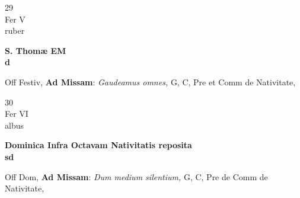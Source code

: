 \documentclass[10pt, openany]{book}
\begin{document}
        \begin{center}
            \begin{minipage}{3.5in}
                \vspace{2em}
                \begin{minipage}{0.5in}
                    {\Huge 29} \\
                    {\normalsize Fer V} \\
                    {\normalsize ruber}
                \end{minipage}
                \begin{minipage}{3.0in}
                    \textbf{ \large S. Thomæ EM \\
                    \textnormal{\normalsize d}} \\ 
                \end{minipage}
                \begin{justify}Off Festiv, \textbf{Ad Missam}: \textit{Gaudeamus omnes,} G, C, Pre et Comm de Nativitate,   
                \end{justify}
            \end{minipage}
        \end{center}
    
        \begin{center}
            \begin{minipage}{3.5in}
                \vspace{2em}
                \begin{minipage}{0.5in}
                    {\Huge 30} \\
                    {\normalsize Fer VI} \\
                    {\normalsize albus}
                \end{minipage}
                \begin{minipage}{3.0in}
                    \textbf{ \large Dominica Infra Octavam Nativitatis reposita \\
                    \textnormal{\normalsize sd}} \\ 
                \end{minipage}
                \begin{justify}Off Dom, \textbf{Ad Missam}: \textit{Dum medium silentium,} G, C, Pre de Comm de Nativitate,   
                \end{justify}
            \end{minipage}
        \end{center}
    
\end{document}
